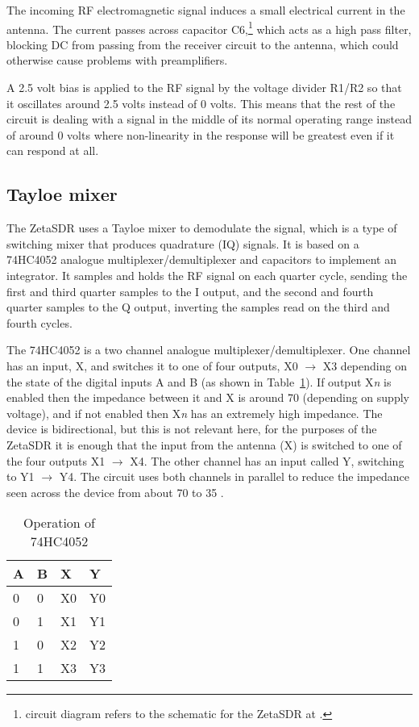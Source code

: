 \documentclass[11pt, twoside]{article}
\begin{document}
The incoming RF electromagnetic signal induces a small electrical
current in the antenna.  The current passes across capacitor
C6,\footnote{circuit diagram refers to the schematic for the ZetaSDR
  at \cite{ly1gp:2007}.} which acts as a high pass filter, blocking DC
from passing from the receiver circuit to the antenna, which could
otherwise cause problems with preamplifiers.

A 2.5 volt bias is applied to the RF signal by the voltage divider
R1/R2 so that it oscillates around 2.5 volts instead of 0 volts.  This
means that the rest of the circuit is dealing with a signal in the
middle of its normal operating range instead of around 0 volts where
non-linearity in the response will be greatest even if it can respond
at all.

\subsection{Tayloe mixer}

The ZetaSDR uses a Tayloe mixer \citep{Tayloe:2013} to demodulate the
signal, which is a type of switching mixer that produces quadrature
(IQ) signals. It is based on a 74HC4052 analogue
multiplexer/demultiplexer and capacitors to implement an integrator.
It samples and holds the RF signal on each quarter cycle, sending the
first and third quarter samples to the I output, and the second and
fourth quarter samples to the Q output, inverting the samples read on
the third and fourth cycles.

The 74HC4052 is a two channel analogue multiplexer/demultiplexer.  One
channel has an input, X, and switches it to one of four outputs, X0
$\rightarrow$ X3 depending on the state of the digital inputs A and B
(as shown in Table~\ref{table:74HC4052}).  If output X{\it n} is
enabled then the impedance between it and X is around 70 {\ohm}
(depending on supply voltage), and if not enabled then X{\it n} has an
extremely high impedance.  The device is bidirectional, but this is
not relevant here, for the purposes of the ZetaSDR it is enough that
the input from the antenna (X) is switched to one of the four outputs
X1 $\rightarrow$ X4. The other channel has an input called Y,
switching to Y1 $\rightarrow$ Y4.  The circuit uses both channels in
parallel to reduce the impedance seen across the device from about 70
{\ohm} to 35 {\ohm}.

\begin{table}[ht]
  \center
  \begin{tabular}{|l| l| l| l|}
    \hline
    A & B & X & Y  \\
    \hline
    \hline
    0 &0& X0& Y0\\
    0 &1& X1& Y1\\
    1 &0& X2& Y2\\
    1 &1& X3& Y3\\
    \hline
  \end{tabular}
  \caption{Operation of 74HC4052}
  \label{table:74HC4052}
\end{table}
\end{document}
